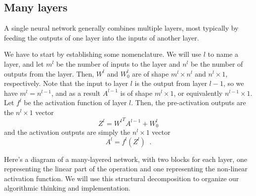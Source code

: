 
\subsection{Many layers}
A single neural network generally combines multiple layers, most
typically by feeding the outputs of one layer into the inputs of
another layer.

We have to start by establishing some nomenclature.  We will use $l$
to name a layer, and let $m^l$ be the number of inputs to the layer
and $n^l$ be the number of outputs from the layer.  Then, $W^l$ and
$W^l_0$ are of shape $m^l \times n^l$ and $n^l \times 1$,
respectively. Note that the input to layer $l$ is the output from
layer $l-1$, so we have $m^l= n^{l-1}$, and as a result $A^{l-1}$ is
of shape $m^l \times 1$, or equivalently $n^{l-1} \times 1$. Let $f^l$
be the activation function of layer
$l$. Then, the pre-activation outputs
are the $n^l \times 1$ vector
\[Z^l = {W^l}^TA^{l-1} + W^l_0\]
and the activation outputs are simply the $n^l \times 1$ vector
\[A^l = f^l(Z^l)\;\;.\]

Here's a diagram of a many-layered network, with two blocks
for each layer, one representing the linear part of the operation and
one representing the non-linear activation function.  We will use this
structural decomposition to organize our algorithmic thinking and
implementation.

